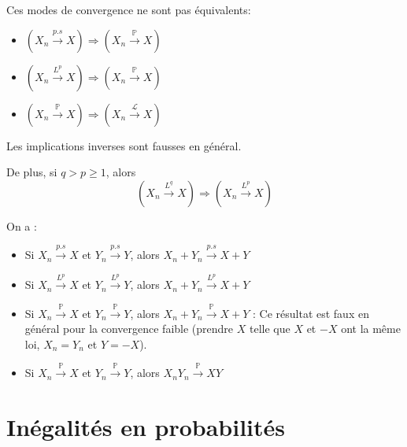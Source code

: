\documentclass[]{book}
\providecommand{\tightlist}{%
  \setlength{\itemsep}{0pt}\setlength{\parskip}{0pt}}
\theoremstyle{definition}
\theoremstyle{definition}
\theoremstyle{definition}
\theoremstyle{remark}
\let\BeginKnitrBlock\begin \let\EndKnitrBlock\end
\begin{document}
\BeginKnitrBlock{theorem}
\protect\hypertarget{thm:unnamed-chunk-73}{}{\label{thm:unnamed-chunk-73} }Ces modes de convergence ne sont pas équivalents:

\begin{itemize}
\tightlist
\item
  \(\left( X_n \xrightarrow{p.s} X \right) \Rightarrow \left( X_n \xrightarrow{\mathbb{P}} X \right)\)
\item
  \(\left( X_n \xrightarrow{L^p} X \right) \Rightarrow \left( X_n \xrightarrow{\mathbb{P}} X \right)\)
\item
  \(\left( X_n \xrightarrow{\mathbb{P}} X \right) \Rightarrow \left( X_n \xrightarrow{\mathcal{L}} X \right)\)
\end{itemize}

Les implications inverses sont fausses en général.

De plus, si \(q > p \geq 1\), alors
\[
  \left( X_n \xrightarrow{L^q} X \right) \Rightarrow \left( X_n \xrightarrow{L^p} X \right)
  \]
\EndKnitrBlock{theorem}

\BeginKnitrBlock{theorem}
\protect\hypertarget{thm:unnamed-chunk-74}{}{\label{thm:unnamed-chunk-74} }On a :

\begin{itemize}
\tightlist
\item
  Si \(X_n \xrightarrow{p.s} X\) et \(Y_n \xrightarrow{p.s} Y\), alors \(X_n + Y_n \xrightarrow{p.s} X + Y\)
\item
  Si \(X_n \xrightarrow{L^p} X\) et \(Y_n \xrightarrow{L^p} Y\), alors \(X_n + Y_n \xrightarrow{L^p} X + Y\)
\item
  Si \(X_n \xrightarrow{\mathbb{P}} X\) et \(Y_n \xrightarrow{\mathbb{P}} Y\), alors \(X_n + Y_n \xrightarrow{\mathbb{P}} X + Y\) : Ce résultat est faux en général pour la convergence faible (prendre \(X\) telle que \(X\) et \(-X\) ont la même loi, \(X_n = Y_n\) et \(Y = -X\)).
\item
  Si \(X_n \xrightarrow{\mathbb{P}} X\) et \(Y_n \xrightarrow{\mathbb{P}} Y\), alors \(X_n Y_n \xrightarrow{\mathbb{P}} X Y\)\\
\end{itemize}
\EndKnitrBlock{theorem}

\hypertarget{inuxe9galituxe9s-en-probabilituxe9s}{%
\section{Inégalités en probabilités}\label{inuxe9galituxe9s-en-probabilituxe9s}}
\end{document}
